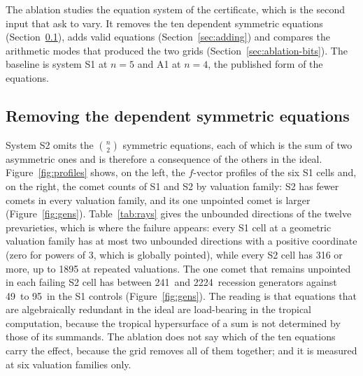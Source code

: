 \documentclass[11pt]{article}
\theoremstyle{definition}
\theoremstyle{remark}
\newcommand{\numGenSoneMin}{49}
\newcommand{\numGenSoneMax}{95}
\newcommand{\numGenStwoMin}{241}
\newcommand{\numGenStwoMax}{2224}
\begin{document}
The ablation studies the equation system of the certificate, which is the second input that \cite{JL25} ask to vary. It removes the ten dependent
symmetric equations (Section~\ref{sec:ablation-remove}), adds valid equations (Section~\ref{sec:adding}) and compares the arithmetic modes that produced the
two grids (Section~\ref{sec:ablation-bits}). The baseline is system S1 at $n=5$ and A1 at $n=4$, the published form of the equations.

\subsection{Removing the dependent symmetric equations}\label{sec:ablation-remove}

System S2 omits the $\binom{n}{2}$ symmetric equations, each of which is the sum of two asymmetric ones and is therefore a consequence of the others in the ideal.
Figure~\ref{fig:profiles} shows, on the left, the $f$-vector profiles of the six S1 cells and, on the right, the comet counts of S1 and S2 by valuation family: S2
has fewer comets in every valuation family, and its one unpointed comet is larger (Figure~\ref{fig:gens}). Table~\ref{tab:rays} gives the unbounded directions of the twelve prevarieties,
which is where the failure appears: every S1 cell at a geometric valuation family has at most two unbounded directions with a positive coordinate (zero for powers of 3, which is globally
pointed), while every S2 cell has 316 or more, up to 1895 at repeated valuations. The one comet that remains unpointed in each failing S2 cell has between \numGenStwoMin\ and
\numGenStwoMax\ recession generators against \numGenSoneMin\ to \numGenSoneMax\ in the S1 controls (Figure~\ref{fig:gens}). The reading is that equations that are algebraically redundant in the ideal are
load-bearing in the tropical computation, because the tropical hypersurface of a sum is not determined by those of its summands. The ablation does not say which of the ten equations carry the
effect, because the grid removes all of them together; and it is measured at six valuation families only.
\end{document}
